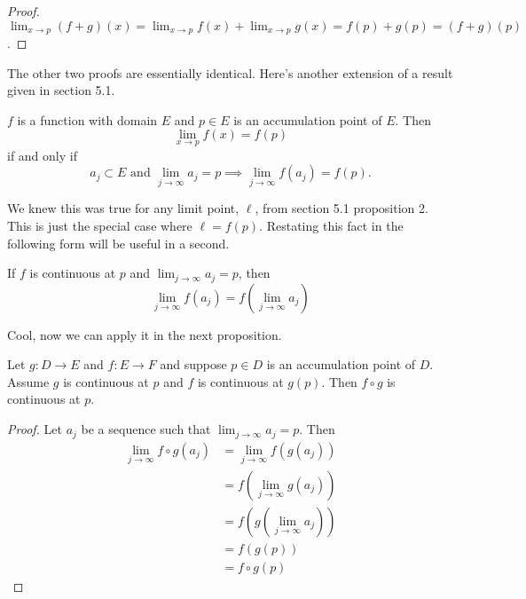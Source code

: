 \documentclass{article}
\begin{document}
\begin{proof}
    \( \lim_{x \to p} (f + g)(x) =  \lim_{x \to p} f(x) + \lim_{x \to p} g(x) = f(p) + g(p) = (f + g)(p)\).
\end{proof}

The other two proofs are essentially identical. Here's another extension of a 
result given in section 5.1. 

 \begin{proposition}
    \( f \) is a function with domain \( E \) and \( p \in E \) is an accumulation point
    of \( E \). Then
    \[
        \lim_{x \to p} f(x) = f(p)
    \] 
    if and only if
    \[
        a_j \subset E \text{ and } \lim_{j \to \infty} a_j = p \implies \lim_{j \to \infty} f(a_j) = f(p).
    \] 
\end{proposition}
We knew this was true for any limit point, \( \ell \), from section 5.1 proposition 2.
This is just the special case where \( \ell = f(p) \).  
\smallbreak
Restating this fact in the following form will be useful in a second.

\begin{corollary}
    If \( f \) is continuous at \( p \) and \( \lim_{j \to \infty} a_j = p \), then
     \[
         \lim_{j \to \infty} f(a_j) = f\left(\lim_{j \to \infty} a_j\right) 
    \] 
\end{corollary}
Cool, now we can apply it in the next proposition.  
\pagebreak

\begin{proposition}
    Let \( g: D \to E \) and \( f: E \to F \) and suppose \( p \in D \) is an accumulation
    point of \( D \). Assume \( g \) is continuous at \( p \) and \( f \) is continuous at
    \( g(p) \). Then \( f \circ g \) is continuous at \( p \).
\end{proposition}
\begin{proof}
    Let \( a_j \) be a sequence such that \( \lim_{j \to \infty} a_j = p \). Then 
    \begin{align*}
        \lim_{j \to \infty} f \circ g(a_j) &= \lim_{j \to \infty} f(g(a_j)) \\
                                           &= f(\lim_{j \to \infty} g(a_j)) \\
                                           &= f( g( \lim_{j \to \infty} a_j)) \\
                                           &= f( g(p)) \\
                                           &= f \circ g(p) 
    \end{align*}
\end{proof}
\end{document}
